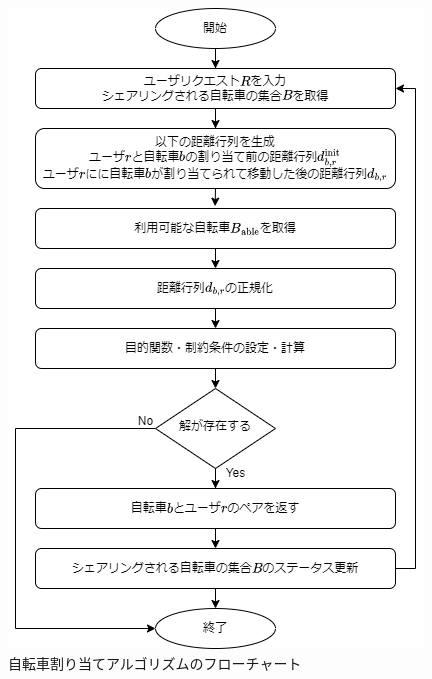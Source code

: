           \begin{figure}[htbp]
            \centering
            \includegraphics[scale=0.54]
            {figures/algorithmImplementation.png}
            \caption{自転車割り当てアルゴリズムのフローチャート}
            \label{fig:自転車割り当てアルゴリズムのフローチャート}
          \end{figure}
          
